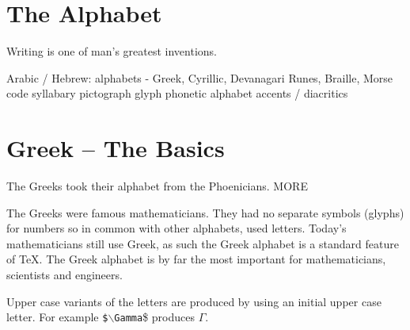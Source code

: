 \documentclass[12pt,a4paper]{article}
\begin{document}
\section{The Alphabet}
Writing is one of man's greatest inventions. 


Arabic / Hebrew: alphabets - Greek, Cyrillic, Devanagari
Runes, Braille, Morse code
syllabary
pictograph
glyph
phonetic alphabet
accents / diacritics

\section{Greek -- The Basics}
The Greeks took their alphabet from the Phoenicians. MORE

The Greeks were famous mathematicians. They had no separate symbols (glyphs) for numbers so in common with other alphabets, used letters. Today's mathematicians still use Greek, as such the Greek alphabet is a standard feature of \TeX. The Greek alphabet is by far the most important for mathematicians, scientists and engineers.

Upper case variants of the letters are produced by using an initial upper case letter. For example \texttt{\$$\backslash$Gamma}\$ produces $\Gamma$.

\medskip
\end{document}
